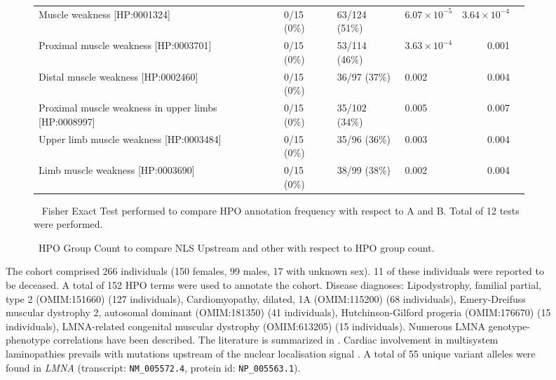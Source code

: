 \begin{figure}[htbp]
\begin{subfigure}[b]{0.95\textwidth}
{\begin{tabular}{llllrr}
Muscle weakness [HP:0001324] & 0/15 (0\%) & 63/124 (51\%) & $6.07\times 10^{-5}$ & $3.64\times 10^{-4}$\\
Proximal muscle weakness [HP:0003701] & 0/15 (0\%) & 53/114 (46\%) & $3.63\times 10^{-4}$ & 0.001\\
Distal muscle weakness [HP:0002460] & 0/15 (0\%) & 36/97 (37\%) & 0.002 & 0.004\\
Proximal muscle weakness in upper limbs [HP:0008997] & 0/15 (0\%) & 35/102 (34\%) & 0.005 & 0.007\\
Upper limb muscle weakness [HP:0003484] & 0/15 (0\%) & 35/96 (36\%) & 0.003 & 0.004\\
Limb muscle weakness [HP:0003690] & 0/15 (0\%) & 38/99 (38\%) & 0.002 & 0.004\\
\bottomrule
\end{tabular}
}
\captionsetup{justification=raggedright,singlelinecheck=false}
\caption{         Fisher Exact Test performed to compare HPO annotation frequency with respect to A and B. Total of
        12 tests were performed. }
\end{subfigure}
\vspace{2em}
\begin{subfigure}[b]{0.95\textwidth}
\captionsetup{justification=raggedright,singlelinecheck=false}
\caption{ HPO Group Count to compare NLS Upstream and other with respect to HPO group count. }
\end{subfigure}

\vspace{2em}

\caption{ The cohort comprised 266 individuals (150 females, 99 males, 17 with unknown sex). 11 of these individuals were reported to be deceased. 
A total of 152 HPO terms were used to annotate the cohort. Disease diagnoses: Lipodystrophy, familial partial, type 2 (OMIM:151660) (127 individuals), 
Cardiomyopathy, dilated, 1A (OMIM:115200) (68 individuals), Emery-Dreifuss muscular dystrophy 2, autosomal dominant (OMIM:181350) (41 individuals), 
Hutchinson-Gilford progeria (OMIM:176670) (15 individuals), LMNA-related congenital muscular dystrophy (OMIM:613205) (15 individuals). 
Numerous LMNA genotype-phenotype correlations have been described. The literature is summarized in \cite{PMID_32413188}. 
Cardiac involvement in multisystem laminopathies prevails with mutations upstream of the nuclear localisation signal \cite{PMID_30402260}.
A total of 55 unique variant alleles were found in \textit{LMNA} (transcript: \texttt{NM\_005572.4}, protein id: \texttt{NP\_005563.1}).}
\end{figure}
